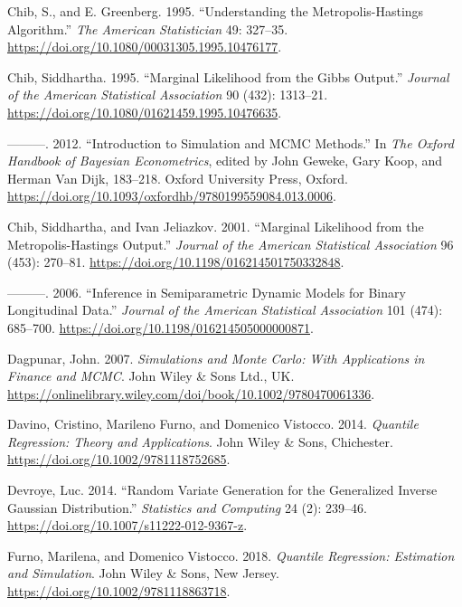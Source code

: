 \begin{CSLReferences}{1}{0}
\leavevmode{}%
Chib, S., and E. Greenberg. 1995. {``Understanding the {Metropolis-Hastings} Algorithm.''} \emph{The American Statistician} 49: 327--35. \url{https://doi.org/10.1080/00031305.1995.10476177}.

\leavevmode{}%
Chib, Siddhartha. 1995. {``Marginal Likelihood from the {Gibbs} Output.''} \emph{{Journal of the American Statistical Association}} 90 (432): 1313--21. \url{https://doi.org/10.1080/01621459.1995.10476635}.

\leavevmode{}%
---------. 2012. {``Introduction to Simulation and {MCMC} Methods.''} In \emph{The {O}xford Handbook of {B}ayesian Econometrics}, edited by John Geweke, Gary Koop, and Herman Van Dijk, 183--218. Oxford University Press, Oxford. \url{https://doi.org/10.1093/oxfordhb/9780199559084.013.0006}.

\leavevmode{}%
Chib, Siddhartha, and Ivan Jeliazkov. 2001. {``Marginal Likelihood from the {Metropolis-Hastings} Output.''} \emph{{Journal of the American Statistical Association}} 96 (453): 270--81. \url{https://doi.org/10.1198/016214501750332848}.

\leavevmode{}%
---------. 2006. {``Inference in Semiparametric Dynamic Models for Binary Longitudinal Data.''} \emph{{Journal of the American Statistical Association}} 101 (474): 685--700. \url{https://doi.org/10.1198/016214505000000871}.

\leavevmode{}%
Dagpunar, John. 2007. \emph{Simulations and {M}onte {C}arlo: With Applications in Finance and {MCMC}}. John Wiley \& Sons Ltd., UK. \url{https://onlinelibrary.wiley.com/doi/book/10.1002/9780470061336}.

\leavevmode{}%
Davino, Cristino, Marileno Furno, and Domenico Vistocco. 2014. \emph{Quantile Regression: Theory and Applications}. John Wiley \& Sons, Chichester. \url{https://doi.org/10.1002/9781118752685}.

\leavevmode{}%
Devroye, Luc. 2014. {``Random Variate Generation for the Generalized Inverse {Gaussian} Distribution.''} \emph{Statistics and Computing} 24 (2): 239--46. \url{https://doi.org/10.1007/s11222-012-9367-z}.

\leavevmode{}%
Furno, Marilena, and Domenico Vistocco. 2018. \emph{Quantile Regression: Estimation and Simulation}. John Wiley \& Sons, New Jersey. \url{https://doi.org/10.1002/9781118863718}.


\end{CSLReferences}
